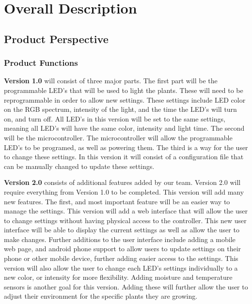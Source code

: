 \documentclass[onecolumn, draftclsnofoot,10pt, compsoc]{IEEEtran}
\begin{document}
	\section*{Overall Description}
		\subsection*{Product Perspective}

		\subsubsection*{Product Functions}
		\noindent \textbf{Version 1.0} will consist of three major parts. The first part will be the programmable LED’s that will be used to light the plants. These will need to be reprogrammable in order to allow new settings.
		These settings include LED color on the RGB spectrum, intensity of the light, and the time the LED’s will turn on, and turn off. All LED’s in this version will be set to the same settings, meaning all
		LED’s will have the same color, intensity and light time. The second will be the microcontroller. The microcontroller will allow the programmable LED’s to be programed, as well as powering them.
		The third is a way for the user to change these settings. In this version it will consist of a configuration file that can be manually changed to update these settings.

		\noindent \textbf{Version 2.0} consists of additional features added by our team. Version 2.0 will require everything from Version 1.0 to be completed. This version will add many new features. The first, and most
		important feature will be an easier way to manage the settings. This version will add a web interface that will allow the user to change settings without having physical access to the controller.
		This new user interface will be able to display the current settings as well as allow the user to make changes. Further additions to the user interface include adding a mobile web page, and android
		phone support to allow users to update settings on their phone or other mobile device, further adding easier access to the settings. This version will also allow the user to change each LED’s
		settings individually to a new color, or intensity for more flexibility. Adding moisture and temperature sensors is another goal for this version. Adding these will further allow the user to adjust
		their environment for the specific plants they are growing.
\end{document}
